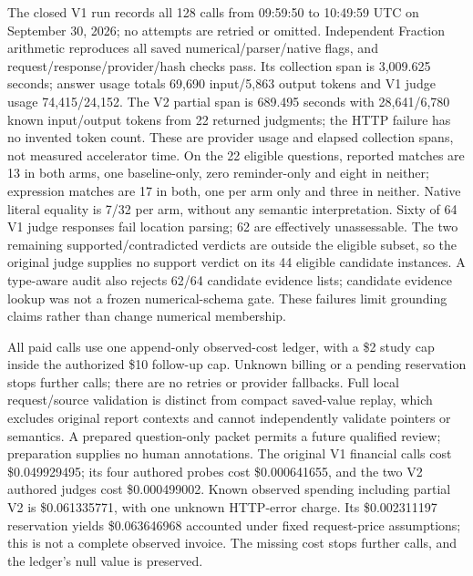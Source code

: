 The closed V1 run records all 128 calls from 09:59:50 to 10:49:59 UTC on September 30, 2026; no attempts are retried or omitted. Independent Fraction arithmetic reproduces all saved numerical/parser/native flags, and request/response/provider/hash checks pass. Its collection span is 3,009.625 seconds; answer usage totals 69,690 input/5,863 output tokens and V1 judge usage 74,415/24,152. The V2 partial span is 689.495 seconds with 28,641/6,780 known input/output tokens from 22 returned judgments; the HTTP failure has no invented token count. These are provider usage and elapsed collection spans, not measured accelerator time. On the 22 eligible questions, reported matches are 13 in both arms, one baseline-only, zero reminder-only and eight in neither; expression matches are 17 in both, one per arm only and three in neither. Native literal equality is 7/32 per arm, without any semantic interpretation. Sixty of 64 V1 judge responses fail location parsing; 62 are effectively unassessable. The two remaining supported/contradicted verdicts are outside the eligible subset, so the original judge supplies no support verdict on its 44 eligible candidate instances. A type-aware audit also rejects 62/64 candidate evidence lists; candidate evidence lookup was not a frozen numerical-schema gate. These failures limit grounding claims rather than change numerical membership.

All paid calls use one append-only observed-cost ledger, with a \$2 study cap inside the authorized \$10 follow-up cap. Unknown billing or a pending reservation stops further calls; there are no retries or provider fallbacks. Full local request/source validation is distinct from compact saved-value replay, which excludes original report contexts and cannot independently validate pointers or semantics. A prepared question-only packet permits a future qualified review; preparation supplies no human annotations. The original V1 financial calls cost \$0.049929495; its four authored probes cost \$0.000641655, and the two V2 authored judges cost \$0.000499002. Known observed spending including partial V2 is \$0.061335771, with one unknown HTTP-error charge. Its \$0.002311197 reservation yields \$0.063646968 accounted under fixed request-price assumptions; this is not a complete observed invoice. The missing cost stops further calls, and the ledger's null value is preserved.

